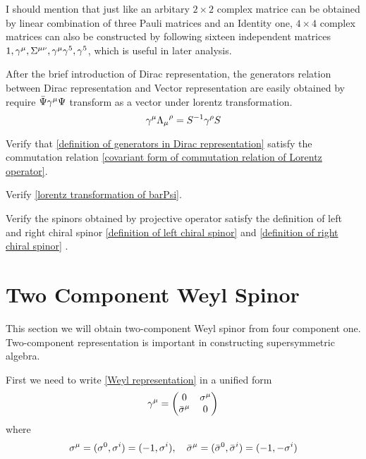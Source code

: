 I should mention that just like an arbitary $2\times2$ complex matrice can be obtained by linear combination of three Pauli matrices and an Identity one, $4\times4$ complex matrices can also be constructed by following sixteen independent matrices $1,\gamma^{\mu},\Sigma^{\mu\nu},\gamma^{\mu}\gamma^5,\gamma^5$, which is useful in later analysis.

After the brief introduction of Dirac representation, the generators relation between Dirac representation and Vector representation are easily obtained by require $\bar{\Psi}\gamma^{\mu}\Psi$ transform as a vector under lorentz transformation.
\begin{equation}\label{lorentz transformation of gamma matrice}
\gamma^{\mu}{\Lambda_{\mu}}^{\rho}=S^{-1}\gamma^{\rho}S
\end{equation}

\begin{Exe}\qquad
	
	Verify that \eqref{definition of generators in Dirac representation} satisfy the commutation relation \eqref{covariant form of commutation relation of Lorentz operator}.
\end{Exe}
\begin{Exe}\qquad
	
	Verify \eqref{lorentz transformation of barPsi}.
\end{Exe}

\begin{Exe}\qquad
	
	Verify the spinors obtained by projective operator satisfy the definition of left and right chiral spinor \eqref{definition of left chiral spinor} and
	\eqref{definition of right chiral spinor} .
\end{Exe}


\section{Two Component Weyl Spinor}
This section we will obtain two-component Weyl spinor from four component one. Two-component representation is important in constructing supersymmetric algebra.

First we need to write \eqref{Weyl representation} in a unified form
\begin{equation}\label{unified form of gamma matrice}
\g^{\m} =\mqty( 0            & \s^{\m}\\
\bar{\s}^{\m}& 0     )
\end{equation}
where
\begin{equation}
\sigma^{\mu} = (\sigma^0,\sigma^i) = (-1,\sigma^{i}),\quad
\bar{\sigma}^{\mu}=(\bar{\sigma}^0,\bar{\sigma}^i)=(-1,-\sigma^{i})
\end{equation}


